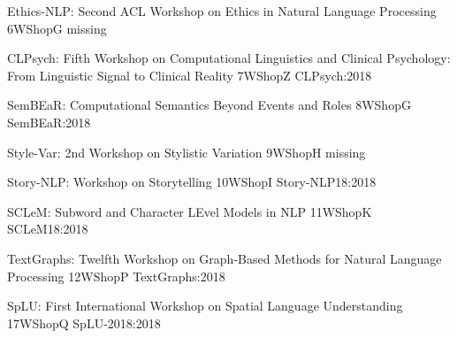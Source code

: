  \begin{wsschedule}
   {Ethics-NLP: Second ACL Workshop on Ethics in Natural Language Processing}
   {6}{WShopG}
   {missing}
   {\WShopLocG}
   
 \end{wsschedule}


\begin{wsschedule}
  {CLPsych: Fifth Workshop on Computational Linguistics and Clinical Psychology: From Linguistic Signal to Clinical Reality}
  {7}{WShopZ}
  {CLPsych:2018}
  {\WShopLocZ}
  
\end{wsschedule}

\begin{wsschedule}
  {SemBEaR: Computational Semantics Beyond Events and Roles}
  {8}{WShopG}
  {SemBEaR:2018}
  {\WShopLocG}
  
\end{wsschedule}

\begin{wsschedule}
  {Style-Var: 2nd Workshop on Stylistic Variation}
  {9}{WShopH}
  {missing}
  {\WShopLocH}
  
\end{wsschedule}

\begin{wsschedule}
  {Story-NLP: Workshop on Storytelling}
  {10}{WShopI}
  {Story-NLP18:2018}
  {\WShopLocI}
  
\end{wsschedule}



\begin{wsschedule}
  {SCLeM: Subword and Character LEvel Models in NLP}
  {11}{WShopK}
  {SCLeM18:2018}
  {\WShopLocK}
  
\end{wsschedule}

  \begin{wsschedule}
   {TextGraphs: Twelfth Workshop on Graph-Based Methods for Natural Language Processing}
   {12}{WShopP}
{TextGraphs:2018}
   {\WShopLocP}
   
 \end{wsschedule}


 \begin{wsschedule}
   {SpLU: First International Workshop on Spatial Language Understanding}
   {17}{WShopQ}
{SpLU-2018:2018}
   {\WShopLocO}
   
 \end{wsschedule}



\clearpage{\thispagestyle{emptyheader}\cleardoublepage}
